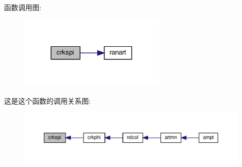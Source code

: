 函数调用图\+:
\nopagebreak
\begin{figure}[H]
\begin{center}
\leavevmode
\includegraphics[width=200pt]{crkspi_8f90_ad91c520d75a564c88c22b35ef12fd506_cgraph}
\end{center}
\end{figure}
这是这个函数的调用关系图\+:
\nopagebreak
\begin{figure}[H]
\begin{center}
\leavevmode
\includegraphics[width=350pt]{crkspi_8f90_ad91c520d75a564c88c22b35ef12fd506_icgraph}
\end{center}
\end{figure}
